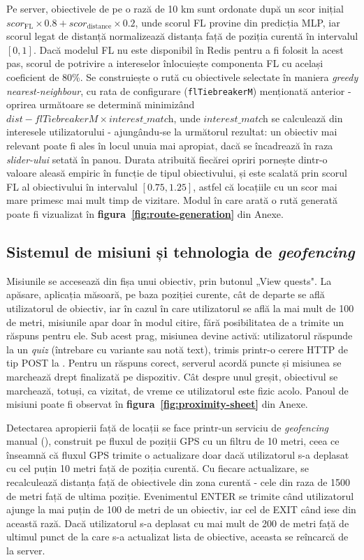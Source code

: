 \documentclass[12pt,a4paper]{report}
\begin{document}
Pe server, obiectivele de pe o rază de 10 km sunt ordonate după un scor inițial $\textit{scor}_{\mathrm{FL}} \times 0.8 + \textit{scor}_{\mathrm{distance}} \times 0.2$, unde scorul FL provine din predicția MLP, iar scorul legat de distanță normalizează distanța față de poziția curentă în intervalul $[0, 1]$. Dacă modelul FL nu este disponibil în Redis pentru a fi folosit la acest pas, scorul de potrivire a intereselor înlocuiește componenta FL cu același coeficient de 80\%. Se construiește o rută cu obiectivele selectate în maniera \textit{greedy nearest-neighbour}, cu rata de configurare (\texttt{flTiebreakerM}) menționată anterior - oprirea următoare se determină minimizând $\textit{dist} - \textit{flTiebreakerM} \times \textit{interest\_match}$, unde $\textit{interest\_match}$ se calculează din interesele utilizatorului - ajungându-se la următorul rezultat: un obiectiv mai relevant poate fi ales în locul unuia mai apropiat, dacă se încadrează în raza \textit{slider-ului} setată în panou. Durata atribuită fiecărei opriri pornește dintr-o valoare aleasă empiric în funcție de tipul obiectivului, și este scalată prin scorul FL al obiectivului în intervalul $[0.75, 1.25]$, astfel că locațiile cu un scor mai mare primesc mai mult timp de vizitare. Modul în care arată o rută generată poate fi vizualizat în \textbf{figura~\ref{fig:route-generation}} din Anexe.

\subsection{Sistemul de misiuni și tehnologia de \textit{geofencing}}

Misiunile se accesează din fișa unui obiectiv, prin butonul „View quests". La apăsare, aplicația măsoară, pe baza poziției curente, cât de departe se află utilizatorul de obiectiv, iar în cazul în care utilizatorul se află la mai mult de 100 de metri, misiunile apar doar în modul citire, fără posibilitatea de a trimite un răspuns pentru ele. Sub acest prag, misiunea devine activă: utilizatorul răspunde la un \textit{quiz} (întrebare cu variante sau notă text), trimis printr-o cerere HTTP de tip POST la . Pentru un răspuns corect, serverul acordă puncte și misiunea se marchează drept finalizată pe dispozitiv. Cât despre unul greșit, obiectivul se marchează, totuși, ca vizitat, de vreme ce utilizatorul este fizic acolo. Panoul de misiuni poate fi observat în \textbf{figura~\ref{fig:proximity-sheet}} din Anexe.

Detectarea apropierii față de locații se face printr-un serviciu de \textit{geofencing} manual (), construit pe fluxul de poziții GPS cu un filtru de 10 metri, ceea ce înseamnă că fluxul GPS trimite o actualizare doar dacă utilizatorul s-a deplasat cu cel puțin 10 metri față de poziția curentă. Cu fiecare actualizare, se recalculează distanța față de obiectivele din zona curentă - cele din raza de 1500 de metri față de ultima poziție. Evenimentul ENTER se trimite când utilizatorul ajunge la mai puțin de 100 de metri de un obiectiv, iar cel de EXIT când iese din această rază. Dacă utilizatorul s-a deplasat cu mai mult de 200 de metri față de ultimul punct de la care s-a actualizat lista de obiective, aceasta se reîncarcă de la server.
\end{document}

